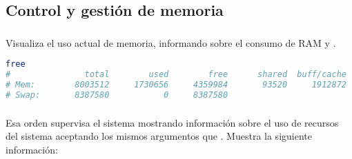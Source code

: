 \subsection{Control y gestión de memoria}

\subsubsection{}

Visualiza el uso actual de memoria, informando sobre el consumo de RAM y .

\begin{lstlisting}[language=Bash]
free
#               total        used        free      shared  buff/cache   available
# Mem:        8003512     1730656     4359984       93520     1912872     5869584
# Swap:       8387580           0     8387580
\end{lstlisting}

\subsubsection{}

Esa orden supervisa el sistema mostrando información sobre el uso de recursos del sistema aceptando los mismos argumentos que .
Muestra la siguiente información:

